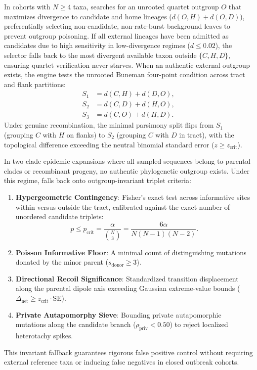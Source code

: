 In cohorts with $N \ge 4$ taxa, \RhizAeon searches for an unrooted quartet outgroup $O$ that maximizes divergence to candidate and home lineages ($d(O, H) + d(O, D)$), preferentially selecting non-candidate, non-rate-burst background leaves to prevent outgroup poisoning.
If all external lineages have been admitted as candidates due to high sensitivity in low-divergence regimes ($d \le 0.02$), the selector falls back to the most divergent available taxon outside $\{C, H, D\}$, ensuring quartet verification never starves.
When an authentic external outgroup exists, the engine tests the unrooted Buneman four-point condition across tract and flank partitions:
\begin{align}
S_1 &= d(C, H) + d(D, O), \label{eq:methods_buneman_s1} \\
S_2 &= d(C, D) + d(H, O), \label{eq:methods_buneman_s2} \\
S_3 &= d(C, O) + d(H, D). \label{eq:methods_buneman_s3}
\end{align}
Under genuine recombination, the minimal parsimony split flips from $S_1$ (grouping $C$ with $H$ on flanks) to $S_2$ (grouping $C$ with $D$ in tract), with the topological difference exceeding the neutral binomial standard error ($z \ge z_{\text{crit}}$).

In two-clade epidemic expansions where all sampled sequences belong to parental clades or recombinant progeny, no authentic phylogenetic outgroup exists.
Under this regime, \RhizAeon falls back onto outgroup-invariant triplet criteria:
\begin{enumerate}
\item \textbf{Hypergeometric Contingency}: Fisher's exact test across informative sites within versus outside the tract, calibrated against the exact number of unordered candidate triplets:
\begin{equation}
p \le p_{\text{crit}} = \frac{\alpha}{\binom{N}{3}} = \frac{6\alpha}{N(N-1)(N-2)}.
\label{eq:methods_bonferroni_triplets}
\end{equation}
\item \textbf{Poisson Informative Floor}: A minimal count of distinguishing mutations donated by the minor parent ($s_{\text{donor}} \ge 3$).
\item \textbf{Directional Recoil Significance}: Standardized transition displacement along the parental dipole axis exceeding Gaussian extreme-value bounds ($\Delta_{\text{net}} \ge z_{\text{crit}} \cdot \text{SE}$).
\item \textbf{Private Autapomorphy Sieve}: Bounding private autapomorphic mutations along the candidate branch ($\rho_{\text{priv}} < 0.50$) to reject localized heterotachy spikes.
\end{enumerate}
This invariant fallback guarantees rigorous false positive control without requiring external reference taxa or inducing false negatives in closed outbreak cohorts.

